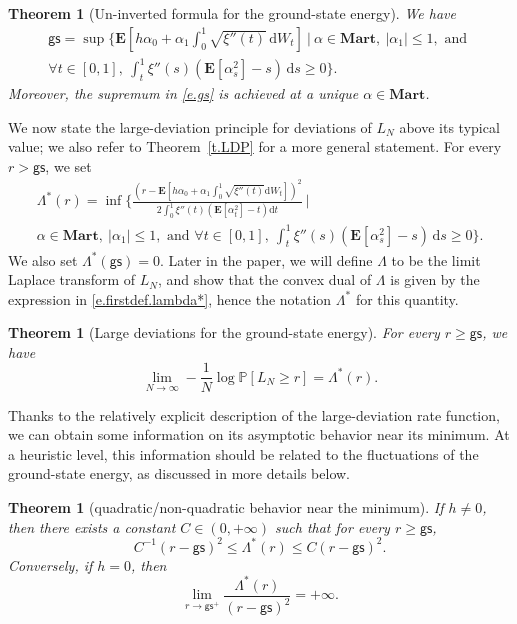\documentclass[11pt]{amsart}
\newtheorem{theorem}[proposition]{Theorem}
\theoremstyle{remark}
\theoremstyle{definition}
\numberwithin{equation}{section}
\numberwithin{proposition}{section}
\numberwithin{figure}{section}
\numberwithin{table}{section}
\renewcommand{\P}{\mathbb{P}}
\newcommand{\EE}{\mathbf{E}}
\renewcommand{\le}{\leqslant}
\renewcommand{\ge}{\geqslant}
\newcommand{\Ll}{\left}
\newcommand{\Rr}{\right}
\renewcommand{\d}{\mathrm{d}}
\newcommand{\1}{\mathbf{1}}
\newcommand{\msf}{\mathsf}
\newcommand{\al}{\alpha}
\newcommand{\bmart}{\mathbf{Mart}}
\begin{document}
\begin{theorem}[Un-inverted formula for the ground-state energy]
\label{t.gs}
We have
\begin{multline}  
\label{e.gs}
\msf{gs} = \sup \bigg\{ \EE \Ll[ h\al_0+ \al_1  \int_0^1 \sqrt{\xi''(t)} \, \d W_t \Rr] 
 \ \Big| \ \al \in \bmart, \ |\alpha_1| \le 1,  \text{ and }   
\\
\forall t \in [0,1], \ \int_t^1 \xi''(s)(\EE[\al_s^2] - s) \, \d s \ge 0
\bigg\}.
\end{multline}
Moreover, the supremum in \eqref{e.gs} is achieved at a unique $\alpha \in \bmart$.
\end{theorem}
We now state the large-deviation principle for deviations of $L_N$ above its typical value; we also refer to Theorem~\ref{t.LDP} for a more general statement. For every $r > \msf{gs}$, we set
\begin{multline}
\label{e.firstdef.lambda*}
\Lambda^*(r) = \inf \Bigg\{\frac{\Ll(r-\EE\Ll[h\alpha_0+\alpha_1\int_0^1\sqrt{\xi''(t)}\d W_t\Rr]\Rr)^2}{2\int_0^1\xi''(t)\Ll(\EE\Ll[\alpha^2_t\Rr]-t\Rr)\d t}
\ \bigg|\  \ 
\\
\al \in \bmart, \ |\alpha_1| \le 1,  \text{ and }   \forall t \in [0,1], \ \int_t^1 \xi''(s)(\EE[\al_s^2] - s) \, \d s \ge 0
\bigg\}.
\end{multline}
We also set $\Lambda^*(\msf{gs}) = 0$. Later in the paper, we will define $\Lambda$ to be the limit Laplace transform of $L_N$, and show that the convex dual of $\Lambda$ is given by the expression in \eqref{e.firstdef.lambda*}, hence the notation $\Lambda^*$ for this quantity. 
\begin{theorem}[Large deviations for the ground-state energy]
\label{t.ldp}
For every $r \ge \msf{gs}$, we have
\begin{equation*}  
\lim_{N \to \infty} - \frac 1 N \log \P \Ll[ L_N \ge r \Rr] 
= \Lambda^*(r).
\end{equation*}
\end{theorem}
Thanks to the relatively explicit description of the large-deviation rate function, we can obtain some information on its asymptotic behavior near its minimum. At a heuristic level, this information should be related to the fluctuations of the ground-state energy, as discussed in more details below. 
\begin{theorem}[quadratic/non-quadratic behavior near the minimum] 
\label{t.quadratic}
If $h \neq 0$, then there exists a constant $C \in(0, +\infty)$ such that for every $r \ge \msf{gs}$,
\begin{equation*}  %
C^{-1} (r-\msf{gs})^2 \le \Lambda^*(r) \le C (r-\msf{gs})^2.
\end{equation*}
Conversely, if $h = 0$, then
\begin{equation*}  %
\lim_{r \to \msf{gs}^+} \frac{\Lambda^*(r)}{(r-\msf{gs})^{2}} = +\infty.
\end{equation*}
\end{theorem}
\end{document}
